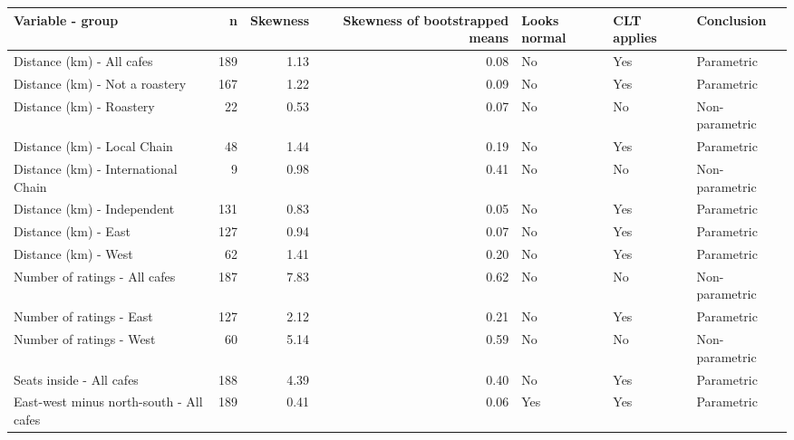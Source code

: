 \begingroup\footnotesize
\begin{tabular}{lrrrlll}
  \toprule
Variable - group & n & Skewness & Skewness of bootstrapped means & Looks normal & CLT applies & Conclusion \\ 
  \midrule
Distance (km) - All cafes & 189 & 1.13 & 0.08 & No & Yes & Parametric \\ 
  Distance (km) - Not a roastery & 167 & 1.22 & 0.09 & No & Yes & Parametric \\ 
  Distance (km) - Roastery &  22 & 0.53 & 0.07 & No & No & Non-parametric \\ 
  Distance (km) - Local Chain &  48 & 1.44 & 0.19 & No & Yes & Parametric \\ 
  Distance (km) - International Chain &   9 & 0.98 & 0.41 & No & No & Non-parametric \\ 
  Distance (km) - Independent & 131 & 0.83 & 0.05 & No & Yes & Parametric \\ 
  Distance (km) - East & 127 & 0.94 & 0.07 & No & Yes & Parametric \\ 
  Distance (km) - West &  62 & 1.41 & 0.20 & No & Yes & Parametric \\ 
  Number of ratings - All cafes & 187 & 7.83 & 0.62 & No & No & Non-parametric \\ 
  Number of ratings - East & 127 & 2.12 & 0.21 & No & Yes & Parametric \\ 
  Number of ratings - West &  60 & 5.14 & 0.59 & No & No & Non-parametric \\ 
  Seats inside - All cafes & 188 & 4.39 & 0.40 & No & Yes & Parametric \\ 
  East-west minus north-south - All cafes & 189 & 0.41 & 0.06 & Yes & Yes & Parametric \\ 
   \bottomrule
\end{tabular}
\endgroup
